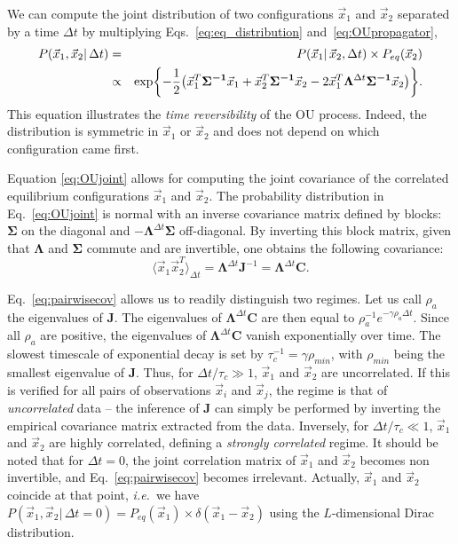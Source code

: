 \documentclass[preprint,amsmath,amssymb,superscriptaddress,showpacs,pre]{revtex4-1}
\let\originalleft\left
\let\originalright\right
\renewcommand{\left}{\mathopen{}\mathclose\bgroup\originalleft}
\renewcommand{\right}{\aftergroup\egroup\originalright}
\newcommand{\ie}{\emph{i.e.}}
\def\vx{\vec x}
\newcommand{\Lam}{\bm{\Lambda}}
\newcommand{\Sig}{\bm{\Sigma}}
\newcommand{\curlynormalpar}[1]{\exp\left\{-\frac{1}{2}\left( #1 \right)\right\}}
\newcommand{\iSig}{\bm{\Sigma^{-1}}}
\begin{document}
We can compute the joint distribution of two configurations $\vx_1$ and $\vx_2$ separated by a time $\Delta t$ by multiplying Eqs.~\eqref{eq:eq_distribution} and~\eqref{eq:OUpropagator}, 
\begin{eqnarray}
    P(\vx_1, \vx_2\vert\,\Delta t) &= & P(\vx_1 |\, \vx_2,\Delta t) \times P_{eq}(\vx_2)
    \nonumber\\
    &\propto& \curlynormalpar{\vx_1^T\iSig\vx_1 + \vx_2^T\iSig\vx_2 - 2\vx_1^T\Lam^{\Delta t}\iSig\vx_2}. 
	\label{eq:OUjoint}	
\end{eqnarray}
This equation illustrates the \emph{time reversibility} of the OU process. 
Indeed, the distribution is symmetric in $\vx_1$ or $\vx_2$ and does not depend on which configuration came first.

Equation \eqref{eq:OUjoint} allows for computing the joint covariance of the correlated equilibrium configurations $\vx_1$ and $\vx_2$. 
The probability distribution in Eq.~\eqref{eq:OUjoint} is normal with an inverse covariance matrix defined by blocks: $\Sig$ on the diagonal and $-\Lam^{\Delta t}\Sig$ off-diagonal. 
By inverting this block matrix, given that $\Lam$ and $\Sig$ commute and are invertible, one obtains the following covariance: 
\begin{equation}
	\langle \vx_1\vx_2^T \rangle_{\Delta t} = \Lam^{\Delta t}\bm{J}^{-1} = \Lam^{\Delta t}\bm{C}. 
	\label{eq:pairwisecov}
\end{equation}


Eq.~\eqref{eq:pairwisecov} allows us to readily distinguish two regimes. 
Let us call $\rho_a$ the eigenvalues of $\bm{J}$. 
The eigenvalues of $\Lam^{\Delta t}\bm{C}$ are then equal to $\rho_a^{-1}e^{-\gamma\rho_a\Delta t}$. 
Since all $\rho_a$ are positive, the eigenvalues of $\Lam^{\Delta t}\bm{C}$ vanish exponentially over time. The slowest timescale of exponential decay is set by $\tau_c^{-1} = \gamma\rho_{min}$, with $\rho_{min}$ being the smallest eigenvalue of $\bm{J}$. 
Thus, for $\Delta t / \tau_c \gg 1$, $\vx_1$ and $\vx_2$ are uncorrelated. 
If this is verified for all pairs of observations $\vx_i$ and $\vx_j$, the regime is that of \emph{uncorrelated} data -- the inference of $\bm{J}$ can simply be performed by inverting the empirical covariance matrix extracted from the data. 
Inversely, for $\Delta t / \tau_c \ll 1$, $\vx_1$ and $\vx_2$ are highly correlated, defining a \emph{strongly correlated} regime. 
It should be noted that for $\Delta t = 0$, the joint correlation matrix of $\vx_1$ and $\vx_2$ becomes non invertible, and Eq.~\eqref{eq:pairwisecov} becomes irrelevant. Actually, $\vx_1$ and $\vx_2$ coincide at that point, \ie~we have $P(\vx_1,\vx_2|\,\Delta t=0) = P_{eq}(\vx_1) \times \delta(\vx_1 - \vx_2)$ using the $L$-dimensional Dirac distribution.
\end{document}
